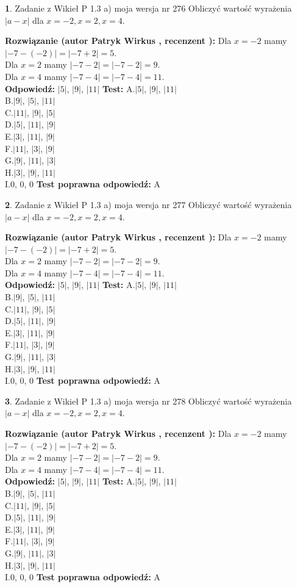 \documentclass[12pt, a4paper]{article}
\theoremstyle{definition} %
\newtheorem{zad}{}
\newcommand{\zadStart}[1]{\begin{zad}#1\newline}
\newcommand{\zadStop}{\end{zad}}
\newcommand{\rozwStart}[2]{\noindent \textbf{Rozwiązanie (autor #1 , recenzent #2): }\newline}
\newcommand{\rozwStop}{\newline}
\newcommand{\odpStart}{\noindent \textbf{Odpowiedź:}\newline}
\newcommand{\odpStop}{\newline}
\newcommand{\testStart}{\noindent \textbf{Test:}\newline}
\newcommand{\testStop}{\newline}
\newcommand{\kluczStart}{\noindent \textbf{Test poprawna odpowiedź:}\newline}
\newcommand{\kluczStop}{\newline}
\begin{document}
\zadStart{Zadanie z Wikieł P 1.3 a) moja wersja nr 276}
Obliczyć wartość wyrażenia $|a - x|$ dla $x=-2,x=2,x=4$.
\zadStop
\rozwStart{Patryk Wirkus}{}
Dla $x = -2$ mamy $|-7 - (-2)| = |-7 + 2| = 5$.\\
Dla $x = 2$ mamy $|-7 - 2| = |-7 - 2| = 9$.\\
Dla $x = 4$ mamy $|-7 - 4| = |-7 - 4| = 11$.\\
\rozwStop
\odpStart
$|5|$, $|9|$, $|11|$
\odpStop
\testStart
A.$|5|$, $|9|$, $|11|$\\
B.$|9|$, $|5|$, $|11|$\\
C.$|11|$, $|9|$, $|5|$\\
D.$|5|$, $|11|$, $|9|$\\
E.$|3|$, $|11|$, $|9|$\\
F.$|11|$, $|3|$, $|9|$\\
G.$|9|$, $|11|$, $|3|$\\
H.$|3|$, $|9|$, $|11|$\\
I.$0$, $0$, $0$
\testStop
\kluczStart
A
\kluczStop



\zadStart{Zadanie z Wikieł P 1.3 a) moja wersja nr 277}
Obliczyć wartość wyrażenia $|a - x|$ dla $x=-2,x=2,x=4$.
\zadStop
\rozwStart{Patryk Wirkus}{}
Dla $x = -2$ mamy $|-7 - (-2)| = |-7 + 2| = 5$.\\
Dla $x = 2$ mamy $|-7 - 2| = |-7 - 2| = 9$.\\
Dla $x = 4$ mamy $|-7 - 4| = |-7 - 4| = 11$.\\
\rozwStop
\odpStart
$|5|$, $|9|$, $|11|$
\odpStop
\testStart
A.$|5|$, $|9|$, $|11|$\\
B.$|9|$, $|5|$, $|11|$\\
C.$|11|$, $|9|$, $|5|$\\
D.$|5|$, $|11|$, $|9|$\\
E.$|3|$, $|11|$, $|9|$\\
F.$|11|$, $|3|$, $|9|$\\
G.$|9|$, $|11|$, $|3|$\\
H.$|3|$, $|9|$, $|11|$\\
I.$0$, $0$, $0$
\testStop
\kluczStart
A
\kluczStop



\zadStart{Zadanie z Wikieł P 1.3 a) moja wersja nr 278}
Obliczyć wartość wyrażenia $|a - x|$ dla $x=-2,x=2,x=4$.
\zadStop
\rozwStart{Patryk Wirkus}{}
Dla $x = -2$ mamy $|-7 - (-2)| = |-7 + 2| = 5$.\\
Dla $x = 2$ mamy $|-7 - 2| = |-7 - 2| = 9$.\\
Dla $x = 4$ mamy $|-7 - 4| = |-7 - 4| = 11$.\\
\rozwStop
\odpStart
$|5|$, $|9|$, $|11|$
\odpStop
\testStart
A.$|5|$, $|9|$, $|11|$\\
B.$|9|$, $|5|$, $|11|$\\
C.$|11|$, $|9|$, $|5|$\\
D.$|5|$, $|11|$, $|9|$\\
E.$|3|$, $|11|$, $|9|$\\
F.$|11|$, $|3|$, $|9|$\\
G.$|9|$, $|11|$, $|3|$\\
H.$|3|$, $|9|$, $|11|$\\
I.$0$, $0$, $0$
\testStop
\kluczStart
A
\kluczStop
\end{document}
